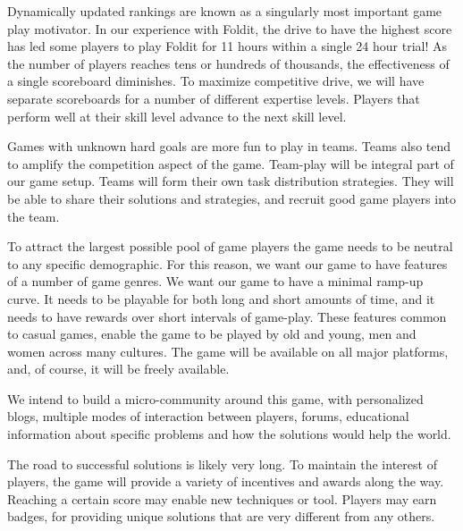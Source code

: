\documentclass[preprint]{sig-alternate}
\let\Description =\description
\def\Nospacing{\itemsep=0pt\topsep=0pt\partopsep=0pt\parskip=0pt\parsep=0pt}
\renewenvironment{description}{\Description\Nospacing}{\endlist}
\begin{document}
\begin{description}
\item[Competition.] Dynamically updated rankings are known as a
  singularly most important game play motivator. In our experience
  with Foldit, the drive to have the highest score has led some
  players to play Foldit for 11 hours within a single 24 hour trial!
  As the number of players reaches tens or hundreds of thousands, the
  effectiveness of a single scoreboard diminishes. To maximize
  competitive drive, we will have separate scoreboards for a number of
  different expertise levels. Players that perform well at their skill
  level advance to the next skill level.

\item[Collaboration.] Games with unknown hard goals are more fun to
  play in teams. Teams also tend to amplify the competition aspect of
  the game. Team-play will be integral part of our game setup. Teams
  will form their own task distribution strategies. They will be able
  to share their solutions and strategies, and recruit good game
  players into the team.

\item[Demographic neutrality.] To attract the largest possible pool of
  game players the game needs to be neutral to any specific
  demographic. For this reason, we want our game to have features of a
  number of game genres. We want our game to have a minimal ramp-up
  curve. It needs to be playable for both long and short amounts of
  time, and it needs to have rewards over short intervals of
  game-play. These features common to casual games, enable the game to
  be played by old and young, men and women across many cultures. The
  game will be available on all major platforms, and, of course, it
  will be freely available.

\item[Game Community.] We intend to build a micro-community around
  this game, with personalized blogs, multiple modes of interaction
  between players, forums, educational information about specific
  problems and how the solutions would help the world.

\item[Encouragement Awards.] The road to successful solutions is
  likely very long. To maintain the interest of players, the game will
  provide a variety of incentives and awards along the way. Reaching a
  certain score may enable new techniques or tool. Players may earn
  badges, for providing unique solutions that are very different from
  any others.


\end{description}
\end{document}
